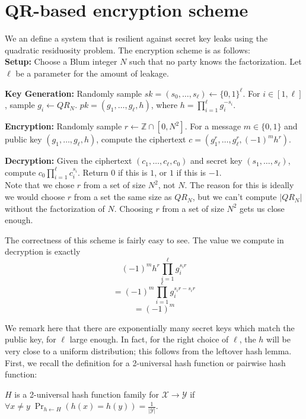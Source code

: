 \documentclass[10pt]{article}
\begin{document}
\section{QR-based encryption scheme}

We an define a system that is resilient against secret key leaks using the quadratic residuosity problem. The encryption scheme is as follows:
\\

\textbf{Setup:} Choose a Blum integer $N$ such that no party knows the factorization. Let $\ell$ be a parameter for the amount of leakage.

\textbf{Key Generation:} Randomly sample  $sk = (s_0,\dots,s_\ell) \leftarrow \{0,1\}^\ell$. For $i \in [1,\ell]$, sample $g_i \leftarrow QR_N$. $pk = (g_1,\dots,g_\ell,h)$, where $h = \prod_{i=1}^\ell g_i^{-s_i}$.

\textbf{Encryption:} Randomly sample $r \leftarrow \mathbb{Z} \cap [0,N^2]$. For a message $m \in \{0,1\}$ and public key $(g_1,\dots,g_\ell,h)$, compute the ciphertext $c = (g_1^r,\dots,g_\ell^r,(-1)^m h^r)$. 

\textbf{Decryption:} Given the ciphertext $(c_1,\dots,c_\ell,c_0)$ and secret key $(s_1,\dots,s_\ell)$, compute $c_0 \prod_{i=1}^\ell c_i^{s_i}$. Return $0$ if this is $1$, or $1$ if this is $-1$.
\\

Note that we chose $r$ from a set of size $N^2$, not $N$. The reason for this is ideally we would choose $r$ from a set the same size as $QR_N$, but we can't compute $|QR_N|$ without the factorization of $N$. Choosing $r$ from a set of size $N^2$ gets us close enough.

The correctness of this scheme is fairly easy to see. The value we compute in decryption is exactly $$(-1)^m h^r \prod_{i=1}^\ell g_i^{s_i r}$$ $$ = (-1)^m \prod_{i=1}^\ell g_i^{s_i r - s_i r}$$ $$ = (-1)^m$$

We remark here that there are exponentially many secret keys which match the public key, for $\ell$ large enough. In fact, for the right choice of $\ell$, the $h$ will be very close to a uniform distribution; this follows from the leftover hash lemma. First, we recall the definition for a 2-universal hash function or pairwise hash function:

\begin{definition}
$H$ is a 2-universal hash function family for $\mathcal{X} \rightarrow \mathcal{Y}$ if $\forall x \neq y \; \Pr_{h \leftarrow H}(h(x) = h(y)) = \frac{1}{|\mathcal{Y}|}$.
\end{definition}
\end{document}
